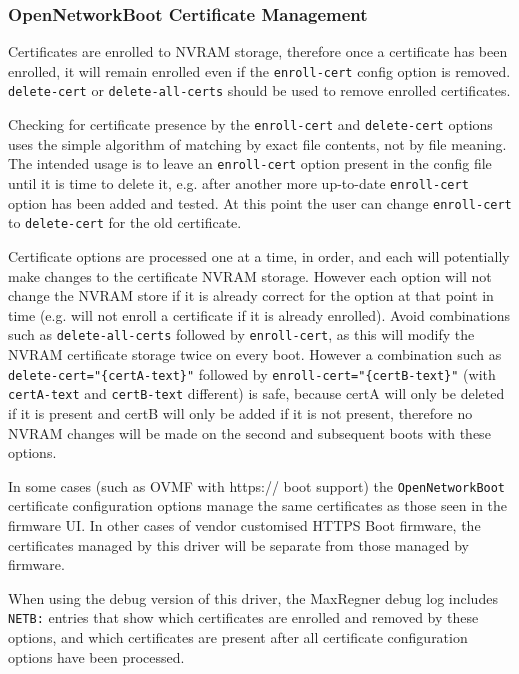 \documentclass[]{article}
\begin{document}
\subsubsection{OpenNetworkBoot Certificate Management}

Certificates are enrolled to NVRAM storage, therefore once
a certificate has been enrolled, it will remain enrolled even if the \texttt{enroll-cert} config
option is removed. \texttt{delete-cert} or \texttt{delete-all-certs}
should be used to remove enrolled certificates.

Checking for certificate presence by the \texttt{enroll-cert}
and \texttt{delete-cert} options uses the simple algorithm
of matching by exact file contents, not by file meaning. The intended
usage is to leave an \texttt{enroll-cert} option present in the config
file until it is time to delete it, e.g. after another more up-to-date
\texttt{enroll-cert} option has been added and tested. At this point
the user can change \texttt{enroll-cert} to \texttt{delete-cert}
for the old certificate. \medskip

Certificate options are processed one at a time, in
order, and each will potentially make changes to the certificate NVRAM storage.
However each option will not change the NVRAM store if it is already correct
for the option at that point in time (e.g. will not enroll a certificate if it is
already enrolled).
Avoid combinations such as \texttt{delete-all-certs} followed by
\texttt{enroll-cert}, as this will modify the NVRAM certificate
storage twice on every boot. However a combination such as
\texttt{delete-cert="\{certA-text\}"} followed by \texttt{enroll-cert="\{certB-text\}"}
(with \texttt{certA-text} and \texttt{certB-text} different) is safe,
because certA will only be deleted if it is present
and certB will only be added if it is not present, therefore no
NVRAM changes will be made on the second and subsequent boots
with these options.

In some cases (such as OVMF with https:// boot support) the
\texttt{OpenNetworkBoot} certificate configuration options manage the same
certificates as those seen in the firmware UI. In other cases of vendor customised
HTTPS Boot firmware, the certificates managed by this driver will be
separate from those managed by firmware.

When using the debug version of this driver, the MaxRegner debug log includes \texttt{NETB:} entries
that show which certificates are enrolled and removed by these options, and which
certificates are present after all certificate configuration options have been processed.
\end{document}
